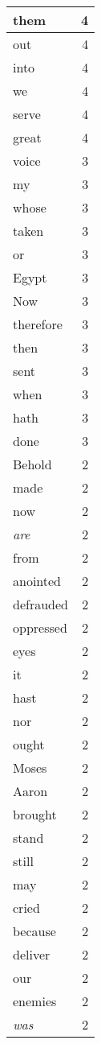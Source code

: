 \begin{center}
\begin{longtable}{l|r}
them & 4 \\ \hline
out & 4 \\ \hline
into & 4 \\ \hline
we & 4 \\ \hline
serve & 4 \\ \hline
great & 4 \\ \hline
voice & 3 \\ \hline
my & 3 \\ \hline
whose & 3 \\ \hline
taken & 3 \\ \hline
or & 3 \\ \hline
Egypt & 3 \\ \hline
Now & 3 \\ \hline
therefore & 3 \\ \hline
then & 3 \\ \hline
sent & 3 \\ \hline
when & 3 \\ \hline
hath & 3 \\ \hline
done & 3 \\ \hline
Behold & 2 \\ \hline
made & 2 \\ \hline
now & 2 \\ \hline
\emph{are} & 2 \\ \hline
from & 2 \\ \hline
anointed & 2 \\ \hline
defrauded & 2 \\ \hline
oppressed & 2 \\ \hline
eyes & 2 \\ \hline
it & 2 \\ \hline
hast & 2 \\ \hline
nor & 2 \\ \hline
ought & 2 \\ \hline
Moses & 2 \\ \hline
Aaron & 2 \\ \hline
brought & 2 \\ \hline
stand & 2 \\ \hline
still & 2 \\ \hline
may & 2 \\ \hline
cried & 2 \\ \hline
because & 2 \\ \hline
deliver & 2 \\ \hline
our & 2 \\ \hline
enemies & 2 \\ \hline
\emph{was} & 2 \\ \hline

\end{longtable}
\end{center}

